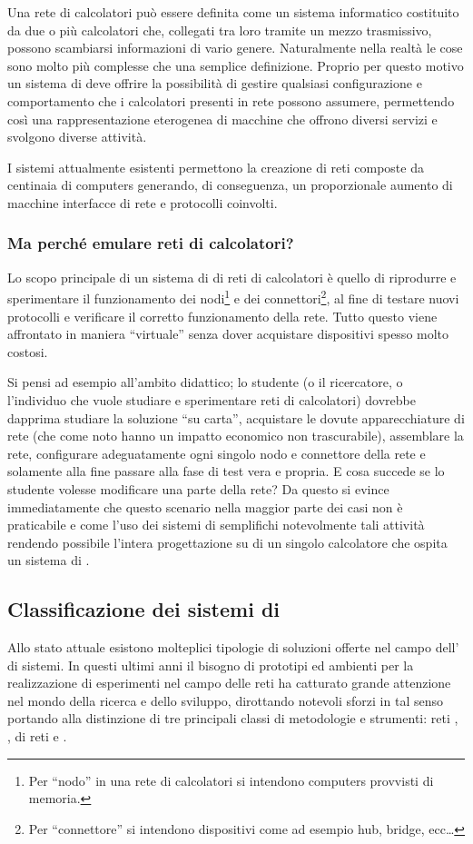 Una rete di calcolatori può essere definita come un sistema informatico costituito da due o più calcolatori che, collegati tra loro tramite un mezzo trasmissivo, possono scambiarsi informazioni di vario genere. Naturalmente nella realtà le cose sono molto più complesse che una semplice definizione. Proprio per questo motivo un sistema di \emulazione{} deve offrire la possibilità di gestire qualsiasi configurazione e comportamento che i calcolatori presenti in rete possono assumere, permettendo così una rappresentazione eterogenea di macchine che offrono diversi servizi e svolgono diverse attività.

I sistemi attualmente esistenti permettono la creazione di reti composte da centinaia di computers generando, di conseguenza, un proporzionale aumento di macchine interfacce di rete e protocolli coinvolti.

\subsubsection{Ma perché emulare reti di calcolatori?}
Lo scopo principale di un sistema di \emulazione{} di reti di calcolatori è quello di riprodurre e sperimentare il funzionamento dei nodi\footnote{Per ``nodo'' in una rete di calcolatori si intendono computers provvisti di memoria.} e dei connettori\footnote{Per ``connettore'' si intendono dispositivi come ad esempio hub, bridge, ecc\ldots}, al fine di testare nuovi protocolli e verificare il corretto funzionamento della rete. Tutto questo viene affrontato in maniera ``virtuale'' senza dover acquistare dispositivi spesso molto costosi.

Si pensi ad esempio all'ambito didattico; lo studente (o il ricercatore, o l'individuo che vuole studiare e sperimentare reti di calcolatori) dovrebbe dapprima studiare la soluzione ``su carta'', acquistare le dovute apparecchiature di rete (che come noto hanno un impatto economico non trascurabile), assemblare la rete, configurare adeguatamente ogni singolo nodo e connettore della rete e solamente alla fine passare alla fase di test vera e propria. E cosa succede se lo studente volesse modificare una parte della rete? Da questo si evince immediatamente che questo scenario nella maggior parte dei casi non è praticabile e come l'uso dei sistemi di \emulazione{} semplifichi notevolmente tali attività rendendo possibile l'intera progettazione su di un singolo calcolatore che ospita un sistema di \emulazione{}.


\subsection{Classificazione dei sistemi di \emulazione{}}
Allo stato attuale esistono molteplici tipologie di soluzioni offerte nel campo dell'\emulazione{} di sistemi. In questi ultimi anni il bisogno di prototipi ed ambienti per la realizzazione di esperimenti nel campo delle reti ha catturato grande attenzione nel mondo della ricerca e dello sviluppo, dirottando notevoli sforzi in tal senso portando alla distinzione di tre principali classi di metodologie e strumenti: reti \testbed{}, \simulazione{}, \emulazione{} di reti e \virtualmachine.

